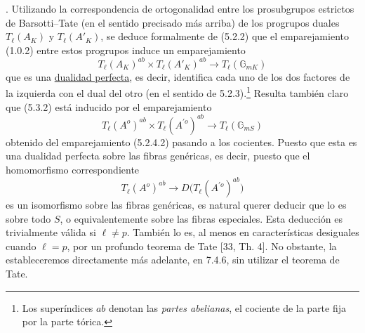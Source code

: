 \par\medskip
{}. Utilizando la correspondencia de ortogonalidad entre los
prosubgrupos estrictos de Barsotti--Tate (en el sentido precisado más
arriba) de los progrupos duales $T_\ell(A_K)$ y $T_\ell(A'_K)$, se
deduce formalmente de (5.2.2) que el emparejamiento (1.0.2) entre estos
progrupos induce un emparejamiento
\begin{equation}\tag{5.3.2}
 T_\ell(A_K)^{ab}\times T_\ell(A'_K)^{ab}
 \longrightarrow T_\ell(\mathbb G_{mK})
\end{equation}
que es una \underline{dualidad perfecta}, es decir, identifica cada uno
de los dos factores de la izquierda con el dual del otro (en el sentido
de 5.2.3).\footnote{Los superíndices $ab$ denotan las \emph{partes
abelianas}, el cociente de la parte fija por la parte tórica.} Resulta
también claro que (5.3.2) está inducido por el emparejamiento
\begin{equation}\tag{5.3.3}
 T_\ell(A^o)^{ab}\times T_\ell(A^{\prime o})^{ab}
 \longrightarrow T_\ell(\mathbb G_{mS})
\end{equation}
obtenido del emparejamiento (5.2.4.2) pasando a los cocientes. Puesto
que esta es una dualidad perfecta sobre las fibras genéricas, es decir,
puesto que el homomorfismo correspondiente
\begin{equation}\tag{5.3.4}
 T_\ell(A^o)^{ab}
 \longrightarrow D\bigl(T_\ell(A^{\prime o})^{ab}\bigr)
\end{equation}
es un isomorfismo sobre las fibras genéricas, es natural querer deducir
que lo es sobre todo $S$, o equivalentemente sobre las fibras
especiales. Esta deducción es trivialmente válida si $\ell\neq p$.
También lo es, al menos en características desiguales cuando $\ell=p$,
por un profundo teorema de Tate [33, Th. 4]. No obstante, la
estableceremos directamente más adelante, en 7.4.6, sin utilizar el
teorema de Tate.

